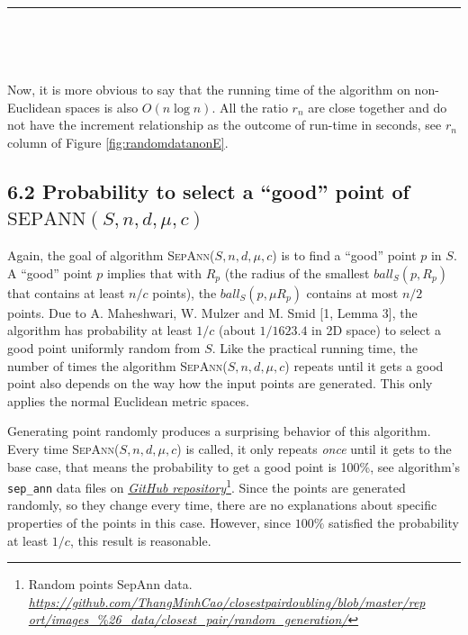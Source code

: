 \documentclass[12pt,english,]{article}
\newcommand{\code}[1]{\colorbox{light-gray}{\texttt{#1}}}
\newcommand{\pnt}[1]{{\scriptstyle#1}}
\begin{document}
\hrule

~

~

Now, it is more obvious to say that the running time of the algorithm on
non-Euclidean spaces is also \(O(n\log n)\). All the ratio \(r_n\) are
close together and do not have the increment relationship as the outcome
of run-time in seconds, see \(r_n\) column of Figure
\ref{fig:randomdatanonE}.

\hypertarget{section6.2}{%
\subsection{\texorpdfstring{6.2 Probability to select a ``good'' point
of
\(\mathrm{S\pnt{EP}A\pnt{NN}}(S,n,d,\mu,c)\)}{6.2 Probability to select a ``good'' point of \textbackslash{}mathrm\{S\textbackslash{}pnt\{EP\}A\textbackslash{}pnt\{NN\}\}(S,n,d,\textbackslash{}mu,c)}}\label{section6.2}}

Again, the goal of algorithm \textsc{SepAnn($S,n,d,\mu,c$)} is to find a
``good'' point \(p\) in \(S\). A ``good'' point \(p\) implies that with
\(R_p\) (the radius of the smallest \(ball_S(p,R_p)\) that contains at
least \(n/c\) points), the \(ball_S(p,\mu R_p)\) contains at most
\(n/2\) points. Due to A. Maheshwari, W. Mulzer and M. Smid {[}1, Lemma
3{]}, the algorithm has probability at least \(1/c\) (about \(1/1623.4\)
in 2D space) to select a good point uniformly random from \(S\). Like
the practical running time, the number of times the algorithm
\textsc{SepAnn($S,n,d,\mu,c$)} repeats until it gets a good point also
depends on the way how the input points are generated. This only applies
the normal Euclidean metric spaces.

Generating point randomly produces a surprising behavior of this
algorithm. Every time \textsc{SepAnn($S,n,d,\mu,c$)} is called, it only
repeats \emph{once} until it gets to the base case, that means the
probability to get a good point is 100\%, see algorithm's
\code{sep\_ann} data files on
\href{https://github.com/ThangMinhCao/closestpairdoubling/blob/master/report/images_\%26_data/closest_pair/random_generation/}{\emph{GitHub
repository}}\footnote{Random points SepAnn data.
  \href{https://github.com/ThangMinhCao/closestpairdoubling/blob/master/report/images_\%26_data/closest_pair/random_generation/}{\emph{https://github.com/ThangMinhCao/closestpairdoubling/blob/master/rep
  ort/images}\_\%\emph{26\_data/closest\_pair/random\_generation/}}}.
Since the points are generated randomly, so they change every time,
there are no explanations about specific properties of the points in
this case. However, since \(100\%\) satisfied the probability at least
\(1/c\), this result is reasonable.
\end{document}
